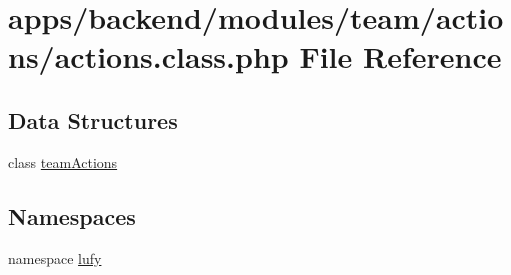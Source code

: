 \hypertarget{backend_2modules_2team_2actions_2actions_8class_8php}{\section{apps/backend/modules/team/actions/actions.class.\-php File Reference}
\label{backend_2modules_2team_2actions_2actions_8class_8php}
}
\subsection*{Data Structures}
\begin{DoxyCompactItemize}
\item 
class \hyperlink{classteam_actions}{team\-Actions}
\end{DoxyCompactItemize}
\subsection*{Namespaces}
\begin{DoxyCompactItemize}
\item 
namespace \hyperlink{namespacelufy}{lufy}
\end{DoxyCompactItemize}
